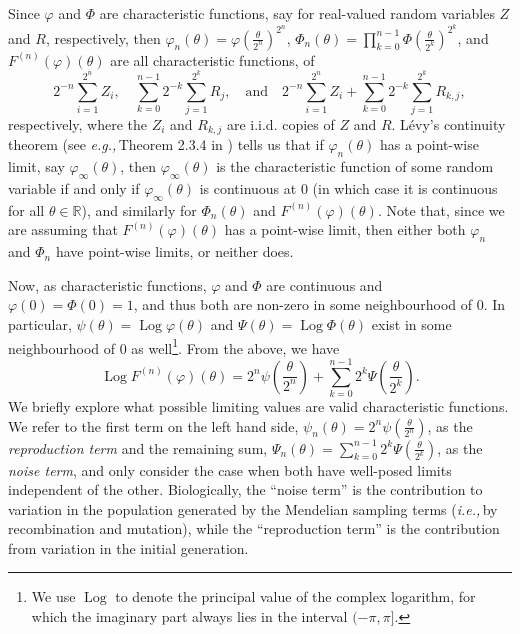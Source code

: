 \documentclass{article}
\newcommand{\ie}{\textit{i.e.,}\,}
\newcommand{\eg}{\textit{e.g.,}\,}
\newcommand{\1}{\mathbbm{1}}
\DeclareMathOperator*{\Log}{Log}
\theoremstyle{remark}
\theoremstyle{definition}
\begin{document}
Since $\varphi$ and $\Phi$ are characteristic functions, say for real-valued random variables $Z$ and $R$, respectively, then $\varphi_n(\theta) = \varphi\left(\frac{\theta}{2^{n}}\right)^{2^{n}}$, $\Phi_{n}(\theta) = \prod_{k=0}^{n-1}\Phi\left(\frac{\theta}{2^{k}}\right)^{2^{k}}$, and $F^{(n)}(\varphi)(\theta)$ are all characteristic functions, of 
\[
	 2^{-n} \sum_{i = 1}^{2^{n}} Z_{i}, \quad \sum_{k = 0}^{n-1} 2^{-k} \sum_{j = 1}^{2^{k}} R_{j}, 
	 \quad \text{and} \quad 
	 2^{-n} \sum_{i = 1}^{2^{n}} Z_{i} + \sum_{k = 0}^{n-1} 2^{-k} \sum_{j = 1}^{2^{k}} R_{k,j},
\]
respectively, where the $Z_{i}$ and $R_{k,j}$ are i.i.d. copies of $Z$ and $R$.   L\'evy's continuity theorem (see \eg Theorem 2.3.4 in \cite{Durrett2005}) tells us that if $\varphi_{n}(\theta)$ has a point-wise limit, say $\varphi_{\infty}(\theta)$, then $\varphi_{\infty}(\theta)$ is the characteristic function of some random variable if and only if $\varphi_{\infty}(\theta)$ is continuous at 0 (in which case it is continuous for all $\theta \in \mathbb{R}$), and similarly for $\Phi_{n}(\theta)$ and $F^{(n)}(\varphi)(\theta)$.  Note that, since we are assuming that $F^{(n)}(\varphi)(\theta)$ has a point-wise limit, then either both $\varphi_{n}$ and $\Phi_{n}$ have point-wise limits, or neither does.

Now, as characteristic functions, $\varphi$ and $\Phi$ are continuous and $\varphi(0) = \Phi(0) = 1$, and thus both are non-zero in some neighbourhood of 0. In particular, $\psi(\theta) = \Log{\varphi}(\theta)$ and $\Psi(\theta) = \Log{\Phi(\theta)}$ exist in some neighbourhood of 0 as well\footnote{We use $\Log$ to denote the principal value of the complex logarithm, for which the imaginary part always lies in the interval $(-\pi,\pi]$.}.  From the above, we have
\[
	\Log{F^{(n)}(\varphi)(\theta)} = {\textstyle 2^{n} \psi\left(\frac{\theta}{2^{n}}\right)} 
		+ \sum_{k=0}^{n-1}  {\textstyle 2^{k} \Psi\left(\frac{\theta}{2^{k}}\right)}.
\]
We briefly explore what possible limiting values are valid characteristic functions. 
We refer to the first term on the left hand side, $\psi_{n}(\theta) = 2^{n} \psi\left(\frac{\theta}{2^{n}}\right)$,  as the \emph{reproduction term} and the remaining sum, $\Psi_{n}(\theta) = \sum_{k=0}^{n-1} 2^{k} \Psi\left(\frac{\theta}{2^{k}}\right)$, as the \emph{noise term}, and only consider the case 
when both have well-posed limits independent of the other.  %
Biologically, 
the ``noise term'' is the contribution to variation in the population
generated by the Mendelian sampling terms (\ie by recombination and mutation),
while the ``reproduction term'' is the contribution from variation in the initial generation.
\end{document}
